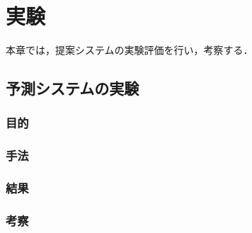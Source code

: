 \chapter{実験}
\label{evaluation}
本章では，提案システムの実験評価を行い，考察する．

\section{予測システムの実験}
\subsection{目的}
\subsection{手法}
\subsection{結果}
\subsection{考察}


